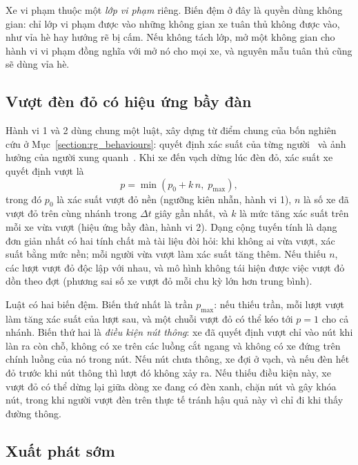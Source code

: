 \documentclass[../main.tex]{subfiles}
\begin{document}
Xe vi phạm thuộc một \emph{lớp vi phạm} riêng. Biến đệm ở đây là quyền dùng không gian: chỉ lớp vi phạm được vào những không gian xe tuân thủ không được vào, như vỉa hè hay hướng rẽ bị cấm. Nếu không tách lớp, mở một không gian cho hành vi vi phạm đồng nghĩa với mở nó cho mọi xe, và nguyên mẫu tuân thủ cũng sẽ dùng vỉa hè.

\subsection{Vượt đèn đỏ có hiệu ứng bầy đàn}

Hành vi 1 và 2 dùng chung một luật, xây dựng từ điểm chung của bốn nghiên cứu ở Mục~\ref{section:rg_behaviours}: quyết định xác suất của từng người~\cite{saval2023mixed,mai2019signal} và ảnh hưởng của người xung quanh~\cite{phuengprachuab2023opportunistic,gao2020redlight}. Khi xe đến vạch dừng lúc đèn đỏ, xác suất xe quyết định vượt là
\begin{equation}
p = \min\left(p_0 + k\,n,\; p_{\max}\right),
\label{eq:swarm}
\end{equation}
trong đó $p_0$ là xác suất vượt đỏ nền (ngưỡng kiên nhẫn, hành vi 1), $n$ là số xe đã vượt đỏ trên cùng nhánh trong $\Delta t$ giây gần nhất, và $k$ là mức tăng xác suất trên mỗi xe vừa vượt (hiệu ứng bầy đàn, hành vi 2). Dạng cộng tuyến tính là dạng đơn giản nhất có hai tính chất mà tài liệu đòi hỏi: khi không ai vừa vượt, xác suất bằng mức nền; mỗi người vừa vượt làm xác suất tăng thêm. Nếu thiếu $n$, các lượt vượt đỏ độc lập với nhau, và mô hình không tái hiện được việc vượt đỏ dồn theo đợt (phương sai số xe vượt đỏ mỗi chu kỳ lớn hơn trung bình).

Luật có hai biến đệm. Biến thứ nhất là trần $p_{\max}$: nếu thiếu trần, mỗi lượt vượt làm tăng xác suất của lượt sau, và một chuỗi vượt đỏ có thể kéo tới $p = 1$ cho cả nhánh. Biến thứ hai là \emph{điều kiện nút thông}: xe đã quyết định vượt chỉ vào nút khi làn ra còn chỗ, không có xe trên các luồng cắt ngang và không có xe đứng trên chính luồng của nó trong nút. Nếu nút chưa thông, xe đợi ở vạch, và nếu đèn hết đỏ trước khi nút thông thì lượt đó không xảy ra. Nếu thiếu điều kiện này, xe vượt đỏ có thể dừng lại giữa dòng xe đang có đèn xanh, chặn nút và gây khóa nút, trong khi người vượt đèn trên thực tế tránh hậu quả này vì chỉ đi khi thấy đường thông.

\subsection{Xuất phát sớm}
\end{document}
